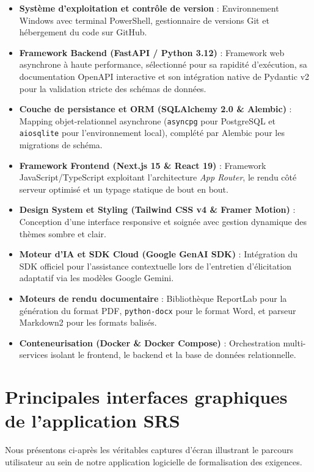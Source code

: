 \begin{itemize}
    \item \textbf{Système d'exploitation et contrôle de version} : Environnement Windows avec terminal PowerShell, gestionnaire de versions Git et hébergement du code sur GitHub.
    \item \textbf{Framework Backend (FastAPI / Python 3.12)} : Framework web asynchrone à haute performance, sélectionné pour sa rapidité d'exécution, sa documentation OpenAPI interactive et son intégration native de Pydantic v2 pour la validation stricte des schémas de données.
    \item \textbf{Couche de persistance et ORM (SQLAlchemy 2.0 \& Alembic)} : Mapping objet-relationnel asynchrone (\texttt{asyncpg} pour PostgreSQL et \texttt{aiosqlite} pour l'environnement local), complété par Alembic pour les migrations de schéma.
    \item \textbf{Framework Frontend (Next.js 15 \& React 19)} : Framework JavaScript/TypeScript exploitant l'architecture \textit{App Router}, le rendu côté serveur optimisé et un typage statique de bout en bout.
    \item \textbf{Design System et Styling (Tailwind CSS v4 \& Framer Motion)} : Conception d'une interface responsive et soignée avec gestion dynamique des thèmes sombre et clair.
    \item \textbf{Moteur d'IA et SDK Cloud (Google GenAI SDK)} : Intégration du SDK officiel pour l'assistance contextuelle lors de l'entretien d'élicitation adaptatif via les modèles Google Gemini.
    \item \textbf{Moteurs de rendu documentaire} : Bibliothèque ReportLab pour la génération du format PDF, \texttt{python-docx} pour le format Word, et parseur Markdown2 pour les formats balisés.
    \item \textbf{Conteneurisation (Docker \& Docker Compose)} : Orchestration multi-services isolant le frontend, le backend et la base de données relationnelle.
\end{itemize}

\section{Principales interfaces graphiques de l'application SRS}

Nous présentons ci-après les véritables captures d'écran illustrant le parcours utilisateur au sein de notre application logicielle de formalisation des exigences.

